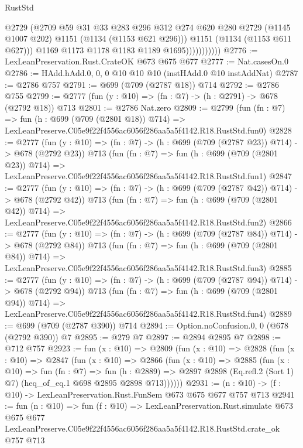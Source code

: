 \begin{lexlean}{RustStd}
\begin{coremodule}
                            @2729
                            (@2709
                              @59
                              @31
                              @33
                              @283
                              @296
                              @312
                              @274
                              @620
                              @280
                              @2729
                              (@1145 @1007 @202)
                              @1151
                              (@1134 (@1153 @621 @296)))
                            @1151
                            (@1134 (@1153 @611 @627)))
                          @1169
                          @1173
                          @1178
                          @1183
                          @1189
                          @1695)))))))))))
@2776 := LexLeanPreservation.Rust.CrateOK @673 @675 @677
@2777 := Nat.casesOn.{0}
@2786 := HAdd.hAdd.{0, 0, 0} @10 @10 @10 (instHAdd.{0} @10 instAddNat)
@2787 := @2786 @757
@2791 := @699 (@709 (@2787 @18)) @714
@2792 := @2786 @755
@2799 := @2777 (fun (y : @10) => (fn : @7) -> (h : @2791) -> @678 (@2792 @18)) @713
@2801 := @2786 Nat.zero
@2809 := @2799
    (fun (fn : @7) =>
    fun (h : @699 (@709 (@2801 @18)) @714) =>
    LexLeanPreserve.C05e9f22f4556ac6056f286aa5a5f4142.R18.RustStd.fun0)
@2828 := @2777
    (fun (y : @10) => (fn : @7) -> (h : @699 (@709 (@2787 @23)) @714) -> @678 (@2792 @23))
    @713
    (fun (fn : @7) =>
    fun (h : @699 (@709 (@2801 @23)) @714) =>
    LexLeanPreserve.C05e9f22f4556ac6056f286aa5a5f4142.R18.RustStd.fun1)
@2847 := @2777
    (fun (y : @10) => (fn : @7) -> (h : @699 (@709 (@2787 @42)) @714) -> @678 (@2792 @42))
    @713
    (fun (fn : @7) =>
    fun (h : @699 (@709 (@2801 @42)) @714) =>
    LexLeanPreserve.C05e9f22f4556ac6056f286aa5a5f4142.R18.RustStd.fun2)
@2866 := @2777
    (fun (y : @10) => (fn : @7) -> (h : @699 (@709 (@2787 @84)) @714) -> @678 (@2792 @84))
    @713
    (fun (fn : @7) =>
    fun (h : @699 (@709 (@2801 @84)) @714) =>
    LexLeanPreserve.C05e9f22f4556ac6056f286aa5a5f4142.R18.RustStd.fun3)
@2885 := @2777
    (fun (y : @10) => (fn : @7) -> (h : @699 (@709 (@2787 @94)) @714) -> @678 (@2792 @94))
    @713
    (fun (fn : @7) =>
    fun (h : @699 (@709 (@2801 @94)) @714) =>
    LexLeanPreserve.C05e9f22f4556ac6056f286aa5a5f4142.R18.RustStd.fun4)
@2889 := @699 (@709 (@2787 @390)) @714
@2894 := Option.noConfusion.{0, 0} (@678 (@2792 @390)) @7
@2895 := @279 @7
@2897 := @2894 @2895 @7
@2898 := @712 @757
@2923 := fun (x : @10) =>
  @2809
    (fun (x : @10) =>
    @2828
      (fun (x : @10) =>
      @2847
        (fun (x : @10) =>
        @2866
          (fun (x : @10) =>
          @2885
            (fun (x : @10) =>
            fun (fn : @7) =>
            fun (h : @2889) =>
            @2897 @2898 (Eq.refl.{2} (Sort 1) @7) (heq_of_eq.{1} @698 @2895 @2898 @713))))))
@2931 := (n : @10) -> (f : @10) -> LexLeanPreservation.Rust.FunSem @673 @675 @677 @757 @713
@2941 := fun (n : @10) =>
  fun (f : @10) =>
  LexLeanPreservation.Rust.simulate
    @673
    @675
    @677
    LexLeanPreserve.C05e9f22f4556ac6056f286aa5a5f4142.R18.RustStd.crate_ok
    @757
    @713
\end{coremodule}
\end{lexlean}
